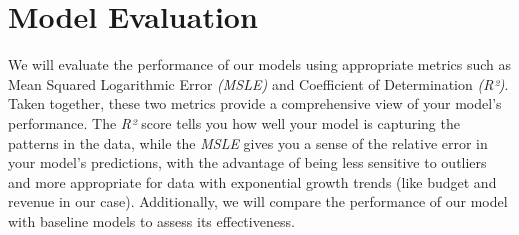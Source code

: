 \documentclass[conference]{IEEEtran}
\begin{document}
\section{Model Evaluation} 
    We will evaluate the performance of our models using appropriate metrics such as Mean Squared Logarithmic Error \textit{(MSLE)} and Coefficient of Determination \textit{(R²)}. Taken together, these two metrics provide a comprehensive view of your model's performance. The \textit{R²} score tells you how well your model is capturing the patterns in the data, while the \textit{MSLE} gives you a sense of the relative error in your model's predictions, with the advantage of being less sensitive to outliers and more appropriate for data with exponential growth trends (like budget and revenue in our case). Additionally, we will compare the performance of our model with baseline models to assess its effectiveness.
\end{document}
